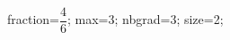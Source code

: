 \documentclass[exercice]{thedocument}%
\begin{document}
%
\>fraction=$\dfrac{4}{6}$;%
\>max=3;%
\>nbgrad=3;%
\>size=2;%
%
\end{document}
